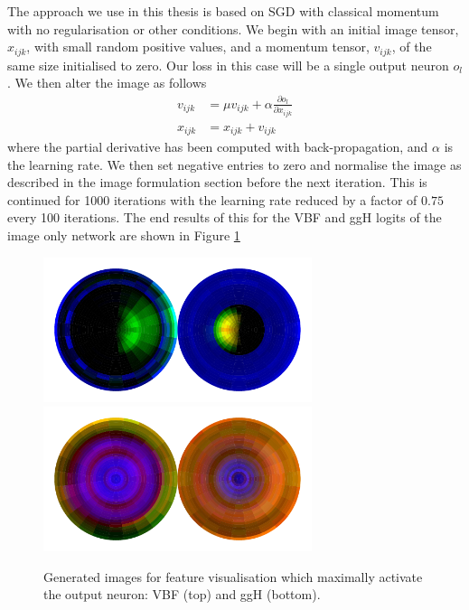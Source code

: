 The approach we use in this thesis is based on SGD with classical momentum with no regularisation or other conditions. 
We begin with an initial image tensor, $x_{ijk}$, with small random positive values, and a momentum tensor, $v_{ijk}$, of the same size initialised to zero.
Our loss in this case will be a single output neuron $o_{l}$. We then alter the image as follows
\begin{equation}
    \begin{split}
        v_{ijk} &= \mu{}v_{ijk} + \alpha\frac{\partial{o_{l}}}{\partial{x_{ijk}}} \\
        x_{ijk} &= x_{ijk} + v_{ijk}
    \end{split}
\end{equation} 
where the partial derivative has been computed with back-propagation, and $\alpha$ is the learning rate. We then set negative entries to zero and normalise the image as described in the image formulation section before the next iteration. This is continued for 1000 iterations with the learning rate reduced by a factor of $0.75$ every 100 iterations. 
The end results of this for the VBF and ggH logits of the image only network are shown in Figure \ref{fig:event_categorisation:feature_vis_vbf_ggh}
\begin{figure}[h!]
    \includegraphics[width=0.7\textwidth]{figures/event_selection/norm_logits1.pdf}
    \includegraphics[width=0.7\textwidth]{figures/event_selection/norm_logits0.pdf}
    \caption{Generated images for feature visualisation which maximally activate the output neuron: VBF (top) and ggH (bottom).}
    \label{fig:event_categorisation:feature_vis_vbf_ggh}
\end{figure}

